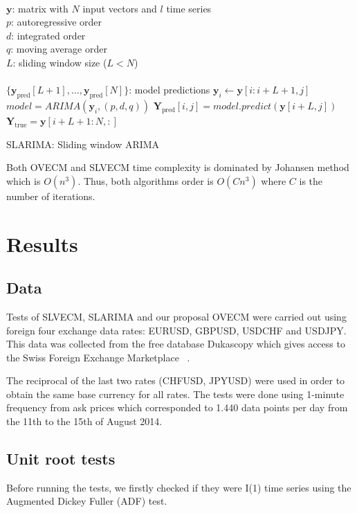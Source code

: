 \begin{algorithm}[ht]
\begin{algorithmic}[1]
\REQUIRE $\,$ \\
$\mathbf{y}$: matrix with $N$ input vectors and $l$ time series\\
$p$: autoregressive order \\
$d$: integrated order\\
$q$: moving average order\\
$L$: sliding window size ($L<N$) \\
\ENSURE  $\,$ \\
$\{ \mathbf{y}_{\text{pred}}[L+1],\dots,\mathbf{y}_{\text{pred}}[N]\}$: model predictions 
    \STATE $\mathbf{y}_i \gets \mathbf{y}[i:i+L+1,j]$
        \STATE $model = ARIMA(\mathbf{y}_i, (p,d,q))$
        \STATE $\mathbf{Y}_{\text{pred}}[i,j] = model.predict(\mathbf{y}[i+L,j])$
\ENDFOR
\ENDFOR
\STATE $\mathbf{Y}_{\text{true}} = \mathbf{y}[i+L+1:N,:] $
\end{algorithmic}
\caption{SLARIMA: Sliding window ARIMA}
\label{alg:SLARIMA}
\end{algorithm}

Both OVECM and SLVECM time complexity is dominated by Johansen method which is
$O(n^3)$. Thus, both algorithms order is $O(Cn^3)$ where $C$ is the number of
iterations. 

    
\section{Results} \label{sec:results}

\subsection{Data} \label{sec:unitroot}
Tests of SLVECM, SLARIMA and our proposal OVECM were carried out using foreign
four exchange data rates: EURUSD, GBPUSD, USDCHF and USDJPY. This data was
collected from the free database Dukascopy which gives access to the Swiss
Foreign Exchange Marketplace ~\cite{Dukascopy2014}.

The reciprocal of the last two rates (CHFUSD, JPYUSD) were used in order to
obtain the same base currency for all rates.  The tests were done using
1-minute frequency from ask prices which corresponded to 1.440 data points per
day from the 11th to the 15th of August 2014.

\subsection{Unit root tests} \label{sec:unitroot}
Before running the tests, we firstly checked if they were I(1) time series
using the Augmented Dickey Fuller (ADF) test.

